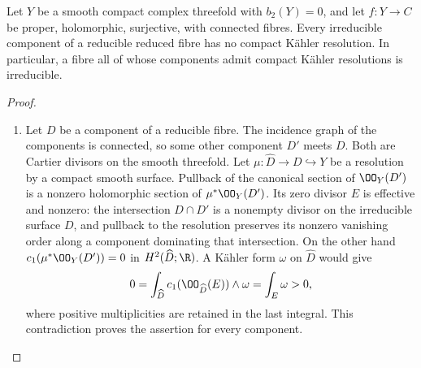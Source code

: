 \begin{proposition}\hypertarget{tag-01FA}{}\label{cdp:st:C.3.4}

Let $Y$ be a smooth compact complex threefold with $b_2(Y)=0$, and let
$f:Y\to C$ be proper, holomorphic, surjective, with connected fibres.
Every irreducible component of a reducible reduced fibre has no
compact K\"ahler resolution. In particular, a fibre all of whose
components admit compact K\"ahler resolutions is irreducible.
\end{proposition}


\begin{proof}
\begin{enumerate}[label={$\langle1\rangle$\arabic*.},leftmargin=*]
\item 
Let $D$ be a component of a reducible fibre. The incidence graph of
the components is connected, so some other component $D'$ meets $D$.
Both are Cartier divisors on the smooth threefold. Let
$\mu:\widehat D\to D\hookrightarrow Y$ be a resolution by a compact
smooth surface. Pullback of the canonical section of $\OO_Y(D')$
is a nonzero holomorphic section of $\mu^*\OO_Y(D')$. Its zero
divisor $E$ is effective and nonzero: the intersection $D\cap D'$
is a nonempty divisor on the irreducible surface $D$, and pullback
to the resolution preserves its nonzero vanishing order along a
component dominating that intersection. On the other hand
$c_1(\mu^*\OO_Y(D'))=0$ in $H^2(\widehat D;\R)$.
A K\"ahler form $\omega$ on $\widehat D$ would give
\[
0=\int_{\widehat D}c_1(\OO_{\widehat D}(E))\wedge\omega
 =\int_E\omega>0,
\]
where positive multiplicities are retained in the last integral.
This contradiction proves the assertion for every component.

\end{enumerate}
\end{proof}